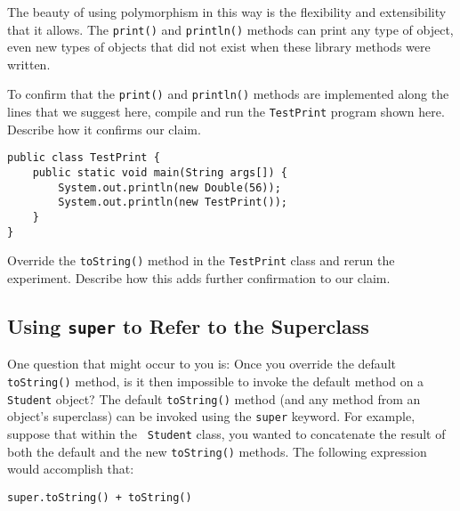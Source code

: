 The beauty of using polymorphism in this way is the flexibility and
extensibility that it allows.  The {\tt print()} and {\tt println()}
methods can print any type of object, even new types of objects that
did not exist when these library methods were written.

\label{self-study-exercises}
\begin{SSTUDY}

\item  To confirm that the {\tt print()} and {\tt println()} methods
are implemented along the lines that we suggest here, compile and run
the {\tt TestPrint} program shown here. Describe how it confirms our claim.

\begin{jjjlisting}
\begin{lstlisting}
public class TestPrint {
    public static void main(String args[]) {
        System.out.println(new Double(56));
        System.out.println(new TestPrint());
    }
}
\end{lstlisting}
\end{jjjlisting}

\item Override the {\tt toString()} method in the {\tt TestPrint}
class and rerun the experiment. Describe how this adds further
confirmation to our claim.

\end{SSTUDY}


\subsection{Using {\tt super} to Refer to the Superclass}

One question that might occur to you is: Once you override the default
{\tt toString()} method, is it then impossible to invoke the default
method on a {\tt Student} object?  The default {\tt toString()} method
(and any method from an object's superclass) can be invoked using the
{\tt super} keyword.  For example, suppose that within the {\tt
Student} class, you wanted to concatenate the result of both the
default and the new {\tt toString()} methods. The following expression
would accomplish that:

\begin{jjjlisting}
\begin{lstlisting}
super.toString() + toString()
\end{lstlisting}
\end{jjjlisting}

